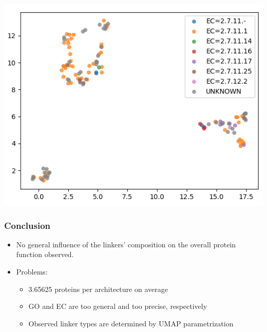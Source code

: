 \documentclass{beamer}
\begin{document}
  \begin{frame}[plain]
    \begin{center}
      \includegraphics[width=\textwidth]{img/linker_umap_ec.png}
    \end{center}
  \end{frame}

  \begin{frame}
    \frametitle{Conclusion}

    \begin{itemize}
      \item No general influence of the linkers' composition on the overall protein
      function observed.
      \item Problems:
      \begin{itemize}
        \item 3.65625 proteins per architecture on average
        \item GO and EC are too general and too precise, respectively
        \item Observed linker types are determined by UMAP parametrization
      \end{itemize}
    \end{itemize}
  \end{frame}
\end{document}
